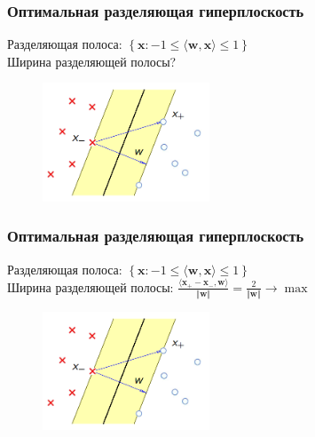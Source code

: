 \documentclass[12pt]{beamer}
\begin{document}
\begin{frame}\frametitle{Оптимальная разделяющая гиперплоскость}
Разделяющая полоса: $\left\{\mathbf{x}: -1 \leq \langle \mathbf{w}, \mathbf{x}\rangle \leq 1\right\}$\\
Ширина разделяющей полосы?
\begin{figure}[htbp]
  \includegraphics[height=100pt, keepaspectratio = true]{images/linearly_separable}   
\end{figure}
\end{frame}

\begin{frame}\frametitle{Оптимальная разделяющая гиперплоскость}
Разделяющая полоса: $\left\{\mathbf{x}: -1 \leq \langle \mathbf{w}, \mathbf{x}\rangle \leq 1\right\}$\\
Ширина разделяющей полосы: $\frac{\langle \mathbf{x_{+}} - \mathbf{x_{-}, \mathbf{w}} \rangle}{\Vert \mathbf{w} \Vert} = \frac{2}{\Vert \mathbf{w} \Vert} \rightarrow \max$
\begin{figure}[htbp]
  \includegraphics[height=100pt, keepaspectratio = true]{images/linearly_separable}   
\end{figure}
\end{frame}
\end{document}

